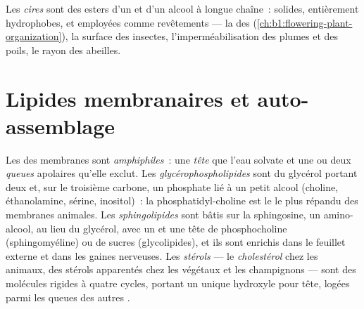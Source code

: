 \begin{definition}[Cires]\label{def:b1:lipids:wax}
Les \emph{cires} sont des esters d'un  et d'un
alcool à longue chaîne~: solides, entièrement hydrophobes, et employées
comme revêtements --- la  des 
(\cref{ch:b1:flowering-plant-organization}), la surface des insectes,
l'imperméabilisation des plumes et des poils, le rayon des abeilles.
\end{definition}

\section{Lipides membranaires et auto-assemblage}

\begin{definition}\label{def:b1:lipids:amphiphilic}
Les  des membranes sont \emph{amphiphiles}~: une \emph{tête}  que l'eau solvate et une ou deux
\emph{queues} apolaires qu'elle exclut. Les
\emph{glycérophospholipides} sont du glycérol
portant deux  et, sur le troisième carbone, un phosphate lié
à un petit alcool  (choline, éthanolamine, sérine, inositol)~: la
phosphatidyl-choline est le  le plus répandu des membranes
animales. Les \emph{sphingolipides} sont bâtis sur
la sphingosine, un amino-alcool, au lieu du glycérol, avec un 
et une tête de phosphocholine (sphingomyéline) ou de sucres
(glycolipides), et ils sont enrichis dans le feuillet externe et dans
les gaines nerveuses. Les \emph{stérols} ---
le \emph{cholestérol} chez les animaux, des stérols
apparentés chez les végétaux et les champignons --- sont des molécules
rigides à quatre cycles, portant un unique hydroxyle pour tête, logées
parmi les queues des autres .
\end{definition}


